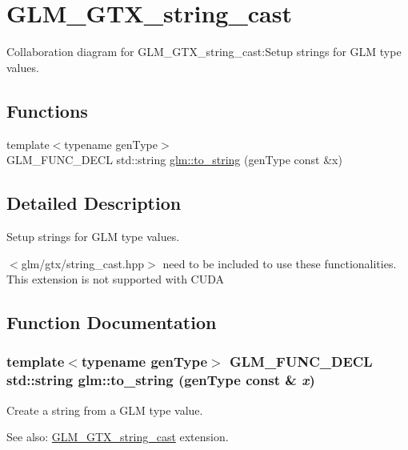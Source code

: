 \hypertarget{group__gtx__string__cast}{
\section{GLM\_\-GTX\_\-string\_\-cast}
\label{group__gtx__string__cast}
}


Collaboration diagram for GLM\_\-GTX\_\-string\_\-cast:Setup strings for GLM type values.  
\subsection*{Functions}
\begin{CompactItemize}
\item 
{\footnotesize template$<$typename genType$>$ }\\GLM\_\-FUNC\_\-DECL std::string \hyperlink{group__gtx__string__cast_ga805c20a3b3ed546b5fccf481697565d}{glm::to\_\-string} (genType const \&x)
\end{CompactItemize}


\subsection{Detailed Description}
Setup strings for GLM type values. 

$<$glm/gtx/string\_\-cast.hpp$>$ need to be included to use these functionalities. This extension is not supported with CUDA 

\subsection{Function Documentation}
\hypertarget{group__gtx__string__cast_ga805c20a3b3ed546b5fccf481697565d}{
\subsubsection[to\_\-string]{\setlength{\rightskip}{0pt plus 5cm}template$<$typename genType$>$ GLM\_\-FUNC\_\-DECL std::string glm::to\_\-string (genType const \& {\em x})}}
\label{group__gtx__string__cast_ga805c20a3b3ed546b5fccf481697565d}


Create a string from a GLM type value. \begin{Desc}
\item[See also:]\hyperlink{group__gtx__string__cast}{GLM\_\-GTX\_\-string\_\-cast} extension. \end{Desc}
